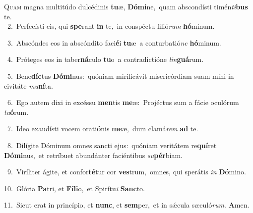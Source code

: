 \lettrine{\initial\textcolor{\initialcolor}{Q}}{uam} magna multitúdo dulcédinis \textbf{tu}\-æ, \textbf{Dó}\-\textbf{mi}ne,~\star quam abscondísti timén\-\textit{ti}\-\textbf{bus} te.\\
{\numbfont\textcolor{\numbcolor}{~2.}}~Perfecísti eis, qui \textbf{spe}\-rant \textbf{in} te,~\star in conspéctu filió\textit{rum} \textbf{hó}\-minum.\par
{\numbfont\textcolor{\numbcolor}{~3.}}~Abscóndes eos in abscóndito faci\-\textbf{é}\-i \textbf{tu}\-æ~\star a conturbatió\textit{ne} \textbf{hó}\-minum.\par
{\numbfont\textcolor{\numbcolor}{~4.}}~Próteges eos in taber\-\textbf{ná}\-culo \textbf{tu}\-o~\star a contradictióne \textit{lin}\-\textbf{guá}rum.\par
{\numbfont\textcolor{\numbcolor}{~5.}}~Bene\-\textbf{díc}\-tus \textbf{Dó}\-\textbf{mi}nus:~\star quóniam mirificávit misericórdiam suam mihi in civitáte \textit{mu}\-\textbf{ní}ta.\par
{\numbfont\textcolor{\numbcolor}{~6.}}~Ego autem dixi in excéssu \textbf{men}\-tis \textbf{me}\-æ:~\star Projéctus sum a fácie oculórum \textit{tu}\-\textbf{ó}rum.\par
{\numbfont\textcolor{\numbcolor}{~7.}}~Ideo exaudísti vocem orati\-\textbf{ó}\-nis \textbf{me}\-æ,~\star dum clamá\textit{rem} \textbf{ad} te.\par
{\numbfont\textcolor{\numbcolor}{~8.}}~Dilígite Dóminum omnes sancti ejus:~\dagger quóniam veritátem re\-\textbf{quí}\-ret \textbf{Dó}\-\textbf{mi}nus,~\star et retríbuet abundánter faciéntibus \textit{su}\-\textbf{pér}biam.\par
{\numbfont\textcolor{\numbcolor}{~9.}}~Viríliter ágite, et confor\-\textbf{té}\-tur cor \textbf{ves}\-trum,~\star omnes, qui sperátis \textit{in} \textbf{Dó}\-mino.\par
{\numbfont\textcolor{\numbcolor}{10.}}~Glória \textbf{Pa}\-tri, et \textbf{Fí}\-\textbf{li}o,~\star et Spirítu\textit{i} \textbf{Sanc}\-to.\par
{\numbfont\textcolor{\numbcolor}{11.}}~Sicut erat in princípio, et \textbf{nunc}\-, et \textbf{sem}\-per,~\star et in sǽcula sæculó\-\textit{rum}\-. \textbf{A}\-men.\par
